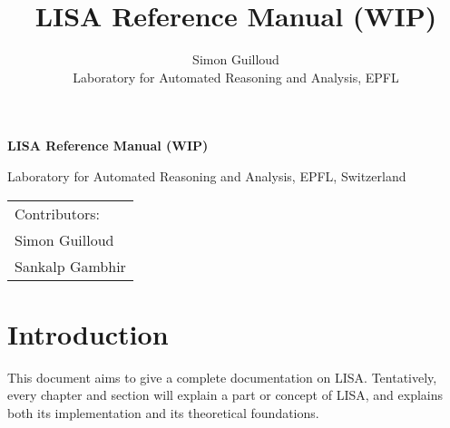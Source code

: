\documentclass[11pt,a4paper]{book}
\title{LISA Reference Manual (WIP)}
\author{Simon Guilloud\\Laboratory for Automated Reasoning and Analysis, EPFL}
\date{}
\begin{document}
\newfontfamily{}

\begin{titlepage}
\titlefont 

    \begin{center}
        \vspace*{1cm}
 
        \textbf{\Huge LISA Reference Manual (WIP)}
             
        \vspace{1.5cm}
 
        {\Large Laboratory for Automated Reasoning and Analysis, EPFL, Switzerland}

        \vspace{1.5cm}

        \date{}

    \end{center}
    \vspace*{10em}
    \begin{flushright}\huge
        \begin{tabular}{l}
         Contributors: \hspace*{2em} \\[1em]
         Simon Guilloud\\
         Sankalp Gambhir
        \end{tabular}
    \end{flushright}
             
 \end{titlepage}
\chapter*{Introduction}

This document aims to give a complete documentation on LISA. Tentatively, every chapter and section will explain a part or concept of LISA, and explains both its implementation and its theoretical foundations. 
 






\end{document}
